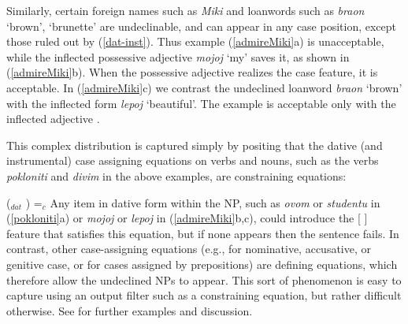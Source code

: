 \begin{sloppypar}
\noindent
  Similarly, certain foreign names such as \textit{Miki} and loanwords such as \emph{braon} `brown', `brunette' are undeclinable, and can appear in any case position, except those ruled out by (\ref{dat-inst}).  Thus  example (\ref{admireMiki}a) is unacceptable, while the inflected possessive
adjective \emph{mojoj} `my'  saves it, as shown in (\ref{admireMiki}b).   When the possessive adjective realizes the case
feature, it is acceptable.  In  (\ref{admireMiki}c) we contrast the undeclined loanword \emph{braon} `brown' with the inflected form \emph{lepoj} `beautiful'.  The example is acceptable only
with the inflected adjective \citep[134]{WZ2003a}.  
\end{sloppypar}

\begin{exe} 
\ex	\label{admireMiki} 
\begin{xlist}
\end{xlist}
\end{exe}

\noindent
This complex distribution is captured simply by positing that the dative (and instrumental) case assigning equations on verbs and nouns, such as the verbs \textit{pokloniti} and \textit{divim} in the above examples, are constraining equations:

\ea
(\up {}$_{dat}$ ) =$_c$ 
\z
Any item in dative form within the NP, such as \textit{ovom} or \textit{studentu} in (\ref{pokloniti}a) or \textit{mojoj} or \textit{lepoj} in (\ref{admireMiki}b,c), could introduce the [ ] feature that satisfies this equation, but if none appears then the sentence fails.  In contrast, other case-assigning equations (e.g., for nominative, accusative, or genitive case, or for cases assigned by prepositions) are defining equations, which therefore allow the undeclined NPs to appear.  This sort of phenomenon is easy to capture using an output filter such as a constraining equation, but rather difficult otherwise.  See \citet{wechsler2001case} for further examples and discussion.  

